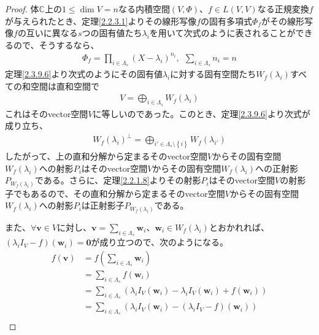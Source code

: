 \documentclass[dvipdfmx]{jsarticle}
\begin{document}
\begin{proof}
体$\mathbb{C}$上の$1 \leq \dim V = n$なる内積空間$(V,\varPhi)$、$f \in L(V,V)$なる正規変換$f$が与えられたとき、定理\ref{2.2.3.1}よりその線形写像$f$の固有多項式$\varPhi_{f}$がその線形写像$f$の互いに異なる$s$つの固有値たち$\lambda_{i}$を用いて次式のように表されることができるので、そうするなら、
\begin{align*}
\varPhi_{f} = \prod_{i \in \varLambda_{s}} \left( X - \lambda_{i} \right)^{n_{i}},\ \ \sum_{i \in \varLambda_{s}} n_{i} = n
\end{align*}
定理\ref{2.3.9.6}より次式のようにその固有値$\lambda_{i}$に対する固有空間たち$W_{f}\left( \lambda_{i} \right)$すべての和空間は直和空間で
\begin{align*}
V = \bigoplus_{i \in \varLambda_{s}} {W_{f}\left( \lambda_{i} \right)}
\end{align*}
これはそのvector空間$V$に等しいのであった。このとき、定理\ref{2.3.9.6}より次式が成り立ち、
\begin{align*}
{W_{f}\left( \lambda_{i} \right)}^{\bot} = \bigoplus_{i' \in \varLambda_s \setminus \left\{ i \right\}} {W_{f}\left( \lambda_{i'} \right)}
\end{align*}
したがって、上の直和分解から定まるそのvector空間$V$からその固有空間$W_{f}\left( \lambda_{i} \right)$への射影$P_{i}$はそのvector空間$V$からその固有空間$W_{f}\left( \lambda_{i} \right)$への正射影$P_{W_{f}\left( \lambda_{i} \right)}$である。さらに、定理\ref{2.2.1.8}よりその射影$P_{i}$はそのvector空間$V$の射影子でもあるので、その直和分解から定まるそのvector空間$V$からその固有空間$W_{f}\left( \lambda_{i} \right)$への射影$P_{i}$は正射影子$P_{W_{f}\left( \lambda_{i} \right)}$である。\par
また、$\forall\mathbf{v} \in V$に対し、$\mathbf{v} = \sum_{i \in \varLambda_{s}} \mathbf{w}_{i}$、$\mathbf{w}_{i} \in W_{f}\left( \lambda_{i} \right)$とおかれれば、$\left( \lambda_{i}I_{V} - f \right)\left( \mathbf{w}_{i} \right) = \mathbf{0}$が成り立つので、次のようになる。
\begin{align*}
f\left( \mathbf{v} \right) &= f\left( \sum_{i \in \varLambda_{s}} \mathbf{w}_{i} \right)\\
&= \sum_{i \in \varLambda_{s}} {f\left( \mathbf{w}_{i} \right)}\\
&= \sum_{i \in \varLambda_{s}} \left( \lambda_{i}I_{V}\left( \mathbf{w}_{i} \right) - \lambda_{i}I_{V}\left( \mathbf{w}_{i} \right) + f\left( \mathbf{w}_{i} \right) \right)\\
&= \sum_{i \in \varLambda_{s}} \left( \lambda_{i}I_{V}\left( \mathbf{w}_{i} \right) - \left( \lambda_{i}I_{V} - f \right)\left( \mathbf{w}_{i} \right) \right)\\

\end{align*}
\end{proof}
\end{document}
